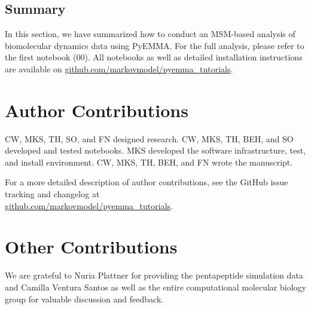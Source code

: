 \documentclass[9pt,tutorial]{livecoms}
\newcommand{\githubrepository}{\url{github.com/markovmodel/pyemma_tutorials}}
\begin{document}
\subsection{Summary}

In this section, we have summarized how to conduct an MSM-based analysis of biomolecular dynamics data using PyEMMA. For the full analysis, please refer to the first notebook (00). All notebooks as well as detailed installation instructions are available on \githubrepository{}.

\section{Author Contributions}
%
CW, MKS, TH, SO, and FN designed research.
CW, MKS, TH, BEH, and SO developed and tested notebooks.
MKS developed the software infrastructure, test, and install environment.
CW, MKS, TH, BEH, and FN wrote the manuscript.

For a more detailed description of author contributions, see the GitHub issue tracking and changelog at\\\githubrepository{}.

\section{Other Contributions}
%
We are grateful to Nuria Plattner for providing the pentapeptide simulation data and Camilla Ventura Santos as well as the entire computational molecular biology group for valuable discussion and feedback.
\end{document}
